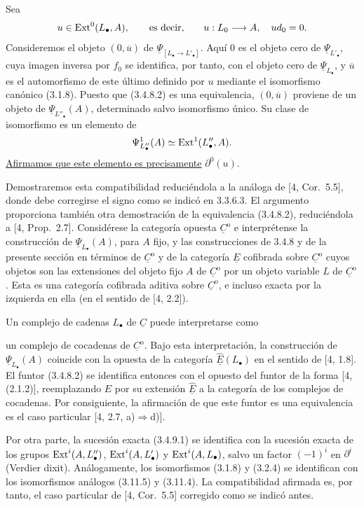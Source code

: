 Sea
\[
 u\in\operatorname{Ext}^0(L_\bullet,A),
 \qquad\text{es decir,}\qquad
 u:L_0\longrightarrow A,\quad ud_0=0.
\]
Consideremos el objeto $(0,\overline u)$ de
$\underline\Psi_{[L_\bullet\to L'_\bullet]}$. Aquí $0$ es el objeto
cero de $\underline\Psi_{L'_\bullet}$, cuya imagen inversa por $f_0$ se
identifica, por tanto, con el objeto cero de
$\underline\Psi_{L_\bullet}$, y $\overline u$ es el automorfismo de este
último definido por $u$ mediante el isomorfismo canónico (3.1.8). Puesto
que (3.4.8.2) es una equivalencia, $(0,\overline u)$ proviene de un objeto
de $\underline\Psi_{L''_\bullet}(A)$, determinado salvo isomorfismo único.
Su clase de isomorfismo es un elemento de
\[
 \Psi^1_{L''_\bullet}(A)\simeq\operatorname{Ext}^1(L''_\bullet,A).
\]
\underline{Afirmamos que este elemento es precisamente} $\partial^0(u)$.

Demostraremos esta compatibilidad reduciéndola a la análoga de
[4, Cor.~5.5], donde debe corregirse el signo como se indicó en 3.3.6.3.
El argumento proporciona también otra demostración de la equivalencia
(3.4.8.2), reduciéndola a [4, Prop.~2.7]. Considérese la categoría opuesta
$\underline C^{\mathrm o}$ e interprétense la construcción de
$\underline\Psi_{L_\bullet}(A)$, para $A$ fijo, y las construcciones de
3.4.8 y de la presente sección en términos de
$\underline C^{\mathrm o}$ y de la categoría $\underline E$ cofibrada
sobre $\underline C^{\mathrm o}$ cuyos objetos son las extensiones del
objeto fijo $A$ de $\underline C^{\mathrm o}$ por un objeto variable $L$
de $\underline C^{\mathrm o}$. Esta es una categoría cofibrada aditiva
sobre $\underline C^{\mathrm o}$, e incluso exacta por la izquierda en
ella (en el sentido de [4, 2.2]).

Un complejo de cadenas $L_\bullet$ de $\underline C$ puede interpretarse
como


un complejo de cocadenas de $\underline C^{\mathrm o}$. Bajo esta
interpretación, la construcción de $\underline\Psi_{L_\bullet}(A)$
coincide con la opuesta de la categoría
$\underline{\widehat E}(L_\bullet)$ en el sentido de [4, 1.8]. El funtor
(3.4.8.2) se identifica entonces con el opuesto del funtor de la forma
[4, (2.1.2)], reemplazando $E$ por su extensión
$\underline{\widehat E}$ a la categoría de los complejos de cocadenas.
Por consiguiente, la afirmación de que este funtor es una equivalencia es
el caso particular [4, 2.7, a)$\Rightarrow$d)].

Por otra parte, la sucesión exacta (3.4.9.1) se identifica con la sucesión
exacta de los grupos $\operatorname{Ext}^i(A,L''_\bullet)$,
$\operatorname{Ext}^i(A,L'_\bullet)$ y $\operatorname{Ext}^i(A,L_\bullet)$, salvo un factor
$(-1)^i$ en $\partial^i$ (Verdier dixit). Análogamente, los isomorfismos
(3.1.8) y (3.2.4) se identifican con los isomorfismos análogos (3.11.5) y
(3.11.4). La compatibilidad afirmada es, por tanto, el caso particular de
[4, Cor.~5.5] corregido como se indicó antes.


